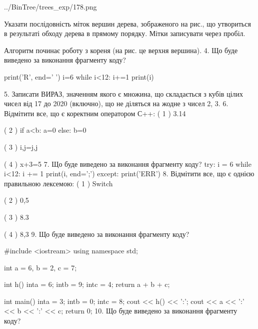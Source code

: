 \documentclass[11pt]{article}
\begin{document}
\begin{center}
	{../BinTree/trees_exp/178.png}
\end{center}
Указати послідовність міток вершин дерева, зображеного на рис., що утвориться в результаті обходу дерева в прямому порядку. Мітки записувати через пробіл.\par Алгоритм починає роботу з кореня (на рис. це верхня вершина).
\vspace{5mm}
4. Що буде виведено за виконання фрагменту коду?

print('R', end=' ')
i=6
while i<12:
    i+=1
print(i)

\vspace{5mm}
5. 
Записати ВИРАЗ, значенням якого є множина, що складається з кубів цілих чисел від 17 до 2020 (включно), що не діляться на жодне з чисел 2, 3.\vspace{5mm}
6. %
Відмітити все, що є коректним оператором С++:
( 1 ) 3.14%

( 2 ) if a<b: a=0 else: b=0

( 3 ) i,j=j,j

( 4 ) x+3=5
\vspace{5mm}
7. Що буде виведено за виконання фрагменту коду?
try:
    i = 6
    while i<12:
        i += 1
    print(i, end=';')
except:
    print('ERR')
\vspace{5mm}
8. %
Відмітити все, що є однією правильною лексемою:
( 1 ) Switch

( 2 ) 0,5

( 3 ) 8.3

( 4 ) 8,3
\vspace{5mm}
9. Що буде виведено за виконання фрагменту коду?

#include <iostream>
using namespace std;

int a = 6, b = 2, c = 7;

int h(){
    inta = 6;
    intb = 9;
    intc = 4;
    return a + b + c;
}

int main(){
    inta = 3;
    intb = 0;
    intc = 8;
    cout << h() << ':';
    cout << a << ':' << b << ':' << c;
    return 0;
}
\vspace{5mm}
10. Що буде виведено за виконання фрагменту коду?
\end{document}
